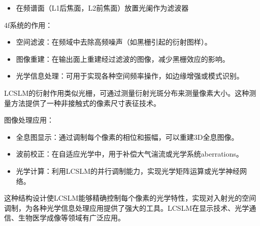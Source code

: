 \documentclass{whureport}
\begin{document}
\begin{multicols}{2}
\begin{itemize}
\item 在频谱面（L1后焦面，L2前焦面）放置光阑作为滤波器
\end{itemize}
4f系统的作用：
\begin{itemize}
    \item 空间滤波：在频域中去除高频噪声（如黑栅引起的衍射图样）。
    \item 图像重建：在输出面上重建经过滤波的图像，减少黑栅效应的影响。
    \item 光学信息处理：可用于实现各种空间频率操作，如边缘增强或模式识别。
\end{itemize}
LCSLM的衍射作用类似光栅，可通过测量衍射光斑分布来测量像素大小。这种测量方法提供了一种非接触式的像素尺寸表征技术。

图像处理应用：
\begin{itemize}
    \item 全息图显示：通过调制每个像素的相位和振幅，可以重建3D全息图像。
    \item 波前校正：在自适应光学中，用于补偿大气湍流或光学系统aberrations。
    \item 光学计算：利用LCSLM的并行调制能力，实现光学矩阵运算或光学神经网络。
\end{itemize}
这种结构设计使LCSLM能够精确控制每个像素的光学特性，实现对入射光的空间调制，为各种光学信息处理应用提供了强大的工具。LCSLM在显示技术、光学通信、生物医学成像等领域有广泛应用。


\end{multicols}
\end{document}
